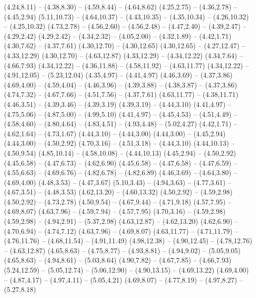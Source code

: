 {  (4.24,8.11) -- (4.38,8.30) -- (4.59,8.44) -- (4.64,8.62)
  (4.25,2.75) -- (4.36,2.78) -- (4.45,2.94)
  (5.11,10.73) -- (4.64,10.37) -- (4.43,10.35) -- (4.35,10.34) -- (4.26,10.32) -- (4.25,10.32)
  (4.73,2.78) -- (4.56,2.60) -- (4.56,2.48) -- (4.47,2.40) -- (4.39,2.47) -- (4.29,2.42)
  (4.29,2.42) -- (4.34,2.32) -- (4.05,2.00) -- (4.32,1.89) -- (4.42,1.71)
  (4.30,7.62) -- (4.37,7.61)
  (4.30,12.70) -- (4.30,12.65)
  (4.30,12.65) -- (4.27,12.47) -- (4.33,12.29)
  (4.30,12.70) -- (4.63,12.87)
  (4.33,12.29) -- (4.34,12.22)
  (4.34,7.64) -- (4.66,7.93)
  (4.34,12.22) -- (4.36,11.88) -- (4.58,11.92) -- (4.63,11.77)
  (4.34,12.22) -- (4.91,12.05) -- (5.23,12.04)
  (4.35,4.97) -- (4.41,4.97)
  (4.46,3.69) -- (4.37,3.86)
  (4.69,4.00) -- (4.59,4.04) -- (4.46,3.96) -- (4.39,3.88) -- (4.38,3.87) -- (4.37,3.86)
  (4.74,7.32) -- (4.67,7.66) -- (4.51,7.56) -- (4.37,7.61)
  (4.63,11.77) -- (4.38,11.71)
  (4.46,3.51) -- (4.39,3.46) -- (4.39,3.19)
  (4.39,3.19) -- (4.44,3.10)
  (4.41,4.97) -- (4.75,5.06) -- (4.87,5.00) -- (4.99,5.10)
  (4.41,4.97) -- (4.45,4.53) -- (4.51,4.49) -- (4.58,4.60) -- (4.80,4.64) -- (4.83,4.51) -- (4.93,4.48) -- (5.02,4.27)
  (4.42,1.71) -- (4.62,1.64) -- (4.73,1.67)
  (4.44,3.10) -- (4.44,3.00)
  (4.44,3.00) -- (4.45,2.94)
  (4.44,3.00) -- (4.50,2.92)
  (4.70,3.16) -- (4.51,3.18) -- (4.44,3.10)
  (4.44,10.13) -- (4.50,9.54)
  (4.85,10.14) -- (4.58,10.08) -- (4.44,10.13)
  (4.45,2.94) -- (4.50,2.92)
  (4.45,6.58) -- (4.47,6.73) -- (4.62,6.90)
  (4.45,6.58) -- (4.47,6.58) -- (4.47,6.59) -- (4.55,6.63) -- (4.69,6.76) -- (4.82,6.78) -- (4.82,6.89)
  (4.46,3.69) -- (4.64,3.80) -- (4.69,4.00)
  (4.48,3.53) -- (4.47,3.67)
  (5.10,3.43) -- (4.94,3.63) -- (4.77,3.61) -- (4.67,3.51) -- (4.48,3.53)
  (4.62,13.20) -- (4.60,13.32)
  (4.50,2.92) -- (4.59,2.98)
  (4.50,2.92) -- (4.73,2.78)
  (4.50,9.54) -- (4.67,9.44) -- (4.71,9.18)
  (4.57,7.95) -- (4.69,8.07)
  (4.63,7.96) -- (4.59,7.94) -- (4.57,7.95)
  (4.70,3.16) -- (4.59,2.98)
  (4.59,2.98) -- (4.94,2.91) -- (5.37,2.98)
  (4.63,12.87) -- (4.62,13.20)
  (4.62,6.90) -- (4.70,6.94) -- (4.74,7.12)
  (4.63,7.96) -- (4.69,8.07)
  (4.63,11.77) -- (4.71,11.79) -- (4.76,11.76) -- (4.68,11.54) -- (4.91,11.49)
  (4.98,12.38) -- (4.90,12.45) -- (4.78,12.76) -- (4.63,12.87)
  (4.65,8.63) -- (4.75,8.77) -- (4.93,8.81) -- (4.94,9.02) -- (5.05,9.05)
  (4.65,8.63) -- (4.94,8.61) -- (5.03,8.64)
  (4.90,7.82) -- (4.67,7.85) -- (4.66,7.93)
  (5.24,12.59) -- (5.05,12.74) -- (5.06,12.90) -- (4.90,13.15) -- (4.69,13.22)
  (4.69,4.00) -- (4.87,4.17) -- (4.97,4.11) -- (5.05,4.21)
  (4.69,8.07) -- (4.77,8.19) -- (4.97,8.27) -- (5.27,8.18)
}
